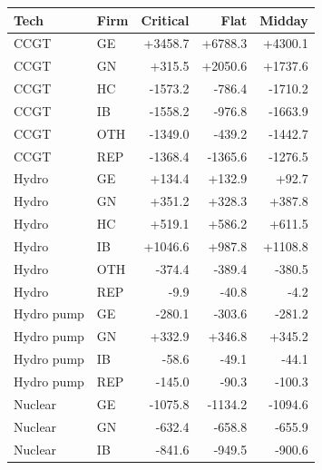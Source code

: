 \begin{tabular}{l l r r r}
\toprule
Tech & Firm & Critical & Flat & Midday \\
\midrule
CCGT & GE & +3458.7 & +6788.3 & +4300.1 \\
CCGT & GN & +315.5 & +2050.6 & +1737.6 \\
CCGT & HC & -1573.2 & -786.4 & -1710.2 \\
CCGT & IB & -1558.2 & -976.8 & -1663.9 \\
CCGT & OTH & -1349.0 & -439.2 & -1442.7 \\
CCGT & REP & -1368.4 & -1365.6 & -1276.5 \\
Hydro & GE & +134.4 & +132.9 & +92.7 \\
Hydro & GN & +351.2 & +328.3 & +387.8 \\
Hydro & HC & +519.1 & +586.2 & +611.5 \\
Hydro & IB & +1046.6 & +987.8 & +1108.8 \\
Hydro & OTH & -374.4 & -389.4 & -380.5 \\
Hydro & REP & -9.9 & -40.8 & -4.2 \\
Hydro pump & GE & -280.1 & -303.6 & -281.2 \\
Hydro pump & GN & +332.9 & +346.8 & +345.2 \\
Hydro pump & IB & -58.6 & -49.1 & -44.1 \\
Hydro pump & REP & -145.0 & -90.3 & -100.3 \\
Nuclear & GE & -1075.8 & -1134.2 & -1094.6 \\
Nuclear & GN & -632.4 & -658.8 & -655.9 \\
Nuclear & IB & -841.6 & -949.5 & -900.6 \\
\bottomrule
\end{tabular}